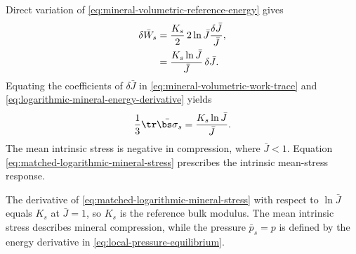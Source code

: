 Direct variation of \eqref{eq:mineral-volumetric-reference-energy} gives
\begin{align}
 \delta\bar W_s
 &=\frac{K_s}{2}\,2\ln\bar J\frac{\delta\bar J}{\bar J},
 \notag
\\
 &=\frac{K_s\ln\bar J}{\bar J}\,\delta\bar J.
 \label{eq:logarithmic-mineral-energy-derivative}
\end{align}
Equating the coefficients of \(\delta\bar J\) in
\eqref{eq:mineral-volumetric-work-trace} and
\eqref{eq:logarithmic-mineral-energy-derivative} yields
\begin{equation}
 \frac13\tr\bar{\bs\sigma}_s=\frac{K_s\ln\bar J}{\bar J}.
 \label{eq:matched-logarithmic-mineral-stress}
\end{equation}
The mean intrinsic stress is negative in compression, where \(\bar J<1\).
Equation \eqref{eq:matched-logarithmic-mineral-stress} prescribes the
intrinsic mean-stress response.

The derivative of \eqref{eq:matched-logarithmic-mineral-stress} with respect to
\(\ln\bar J\) equals \(K_s\) at \(\bar J=1\), so \(K_s\) is the reference
bulk modulus.  The mean intrinsic stress describes mineral compression, while
the pressure \(\bar p_s=p\) is defined by the energy derivative in
\eqref{eq:local-pressure-equilibrium}.

